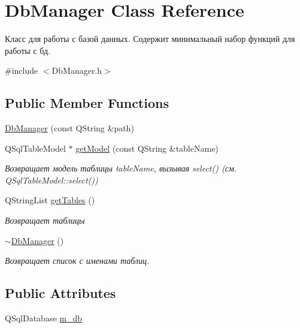 \hypertarget{class_db_manager}{}\section{Db\+Manager Class Reference}
\label{class_db_manager}


Класс для работы с базой данных. Содержит минимальный набор функций для работы с бд.  




{\ttfamily \#include $<$Db\+Manager.\+h$>$}

\subsection*{Public Member Functions}
\begin{DoxyCompactItemize}
\item 
\hyperlink{class_db_manager_a449b4cc451c4ec493345d799891e7eaa}{Db\+Manager} (const Q\+String \&path)
\item 
Q\+Sql\+Table\+Model $\ast$ \hyperlink{class_db_manager_a4b9a7828f0d6e53b695da5168570653c}{get\+Model} (const Q\+String \&table\+Name)
\begin{DoxyCompactList}\small\item\em Возвращает модель таблицы table\+Name, вызывая select() (см. Q\+Sql\+Table\+Model\+::select()) \end{DoxyCompactList}\item 
Q\+String\+List \hyperlink{class_db_manager_a56efe9d49dc68dcdef05ae834f7618b0}{get\+Tables} ()
\begin{DoxyCompactList}\small\item\em Возвращает таблицы \end{DoxyCompactList}\item 
\mbox{\label{class_db_manager_ac5cdf8e5e932d1681ab807d8f256374c}} 
\hyperlink{class_db_manager_ac5cdf8e5e932d1681ab807d8f256374c}{$\sim$\+Db\+Manager} ()
\begin{DoxyCompactList}\small\item\em Возвращает список с именами таблиц. \end{DoxyCompactList}\end{DoxyCompactItemize}
\subsection*{Public Attributes}
\begin{DoxyCompactItemize}
\item 
Q\+Sql\+Database \hyperlink{class_db_manager_a289f7f1c539781db95292c79fb13a632}{m\+\_\+db}
\end{DoxyCompactItemize}


